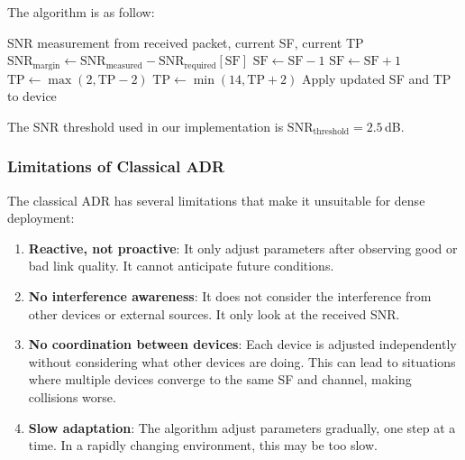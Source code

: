 \documentclass[12pt,a4paper]{article}
\begin{document}
The algorithm is as follow:

\begin{algorithm}[H]
\caption{Classical LoRaWAN ADR Algorithm}
\label{alg:classical_adr_algorithm}
\begin{algorithmic}[1]
\Require SNR measurement from received packet, current SF, current TP
\State $\text{SNR}_{\text{margin}} \gets \text{SNR}_{\text{measured}} - \text{SNR}_{\text{required}}[\text{SF}]$
    \State $\text{SF} \gets \text{SF} - 1$ 
    \State $\text{SF} \gets \text{SF} + 1$ 
\EndIf
{}
    \State $\text{TP} \gets \max(2, \text{TP} - 2)$ 
    \State $\text{TP} \gets \min(14, \text{TP} + 2)$ 
\EndIf
\State Apply updated SF and TP to device
\end{algorithmic}
\end{algorithm}

The SNR threshold used in our implementation is $\text{SNR}_{\text{threshold}} = 2.5$\,dB.

\subsubsection{Limitations of Classical ADR}

The classical ADR has several limitations that make it unsuitable for dense deployment:

\begin{enumerate}
    \item \textbf{Reactive, not proactive}: It only adjust parameters after observing good or bad link quality. It cannot anticipate future conditions.
    \item \textbf{No interference awareness}: It does not consider the interference from other devices or external sources. It only look at the received SNR.
    \item \textbf{No coordination between devices}: Each device is adjusted independently without considering what other devices are doing. This can lead to situations where multiple devices converge to the same SF and channel, making collisions worse.
    \item \textbf{Slow adaptation}: The algorithm adjust parameters gradually, one step at a time. In a rapidly changing environment, this may be too slow.
\end{enumerate}
\end{document}
